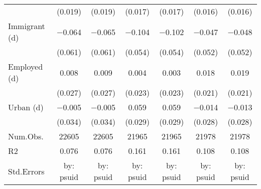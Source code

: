 \begin{table}
\begin{tabular}[t]{lcccccc}
 & (\num{0.019}) & (\num{0.019}) & (\num{0.017}) & (\num{0.017}) & (\num{0.016}) & (\num{0.016})\\
Immigrant (d) & \num{-0.064} & \num{-0.065} & \num{-0.104} & \num{-0.102} & \num{-0.047} & \num{-0.048}\\
 & (\num{0.061}) & (\num{0.061}) & (\num{0.054}) & (\num{0.054}) & (\num{0.052}) & (\num{0.052})\\
Employed (d) & \num{0.008} & \num{0.009} & \num{0.004} & \num{0.003} & \num{0.018} & \num{0.019}\\
 & (\num{0.027}) & (\num{0.027}) & (\num{0.023}) & (\num{0.023}) & (\num{0.021}) & (\num{0.021})\\
Urban (d) & \num{-0.005} & \num{-0.005} & \num{0.059} & \num{0.059} & \num{-0.014} & \num{-0.013}\\
 & (\num{0.034}) & (\num{0.034}) & (\num{0.029}) & (\num{0.029}) & (\num{0.028}) & (\num{0.028})\\
\midrule
Num.Obs. & \num{22605} & \num{22605} & \num{21965} & \num{21965} & \num{21978} & \num{21978}\\
R2 & \num{0.076} & \num{0.076} & \num{0.161} & \num{0.161} & \num{0.108} & \num{0.108}\\
Std.Errors & by: psuid & by: psuid & by: psuid & by: psuid & by: psuid & by: psuid\\
\bottomrule
\end{tabular}
\end{table}